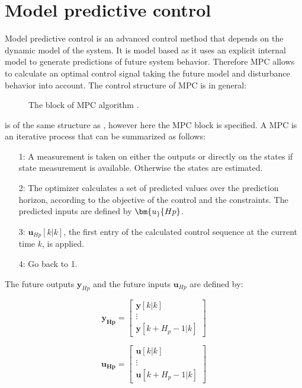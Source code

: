 \section{Model predictive control}
\label{sec:MPC}

Model predictive control is an advanced control method that depends on the dynamic model of the system. It is model based as it uses an explicit internal model to generate predictions of future system behavior. Therefore MPC allows to calculate an optimal control signal taking the future model and disturbance behavior into account. The control structure of MPC is in general:

\begin{figure}[H]
\centering
 
\caption{The block of MPC algorithm \cite{Camacho2007}.}
\label{mpc_structure}
\end{figure}

 is of the same structure as , however here the MPC block is specified. A MPC is an iterative process that can be summarized as follows: 

\begin{itemize}
\item[1:] A measurement is taken on either the outputs or directly on the states if state measurement is available. Otherwise the states are estimated. 
\item[2:] The optimizer calculates a set of predicted values over the prediction horizon, according to the objective of the control and the constraints. The predicted inputs are defined by $\bm{u_}{Hp}$.
\item[3:] $\bm{u}_{Hp}[k|k]$, the first entry of the calculated control sequence at the current time $k$, is applied.
\item[4:] Go back to 1. 
\end{itemize}

The future outputs $\bm{y}_{Hp}$ and the future inputs $\bm{u}_{Hp}$ are defined by:

\begin{equation}
\bm{y_{Hp}} =  
 \begin{bmatrix}
  \bm{y}[k|k]\\
  \vdots  \\
  \bm{y}[k+H_p-1|k]   
 \end{bmatrix}
\end{equation}

\begin{equation}
\bm{u_{Hp}} =  
 \begin{bmatrix}
  \bm{u}[k|k]\\
  \vdots  \\
  \bm{u}[k+H_p-1|k]   
 \end{bmatrix}
\end{equation}

